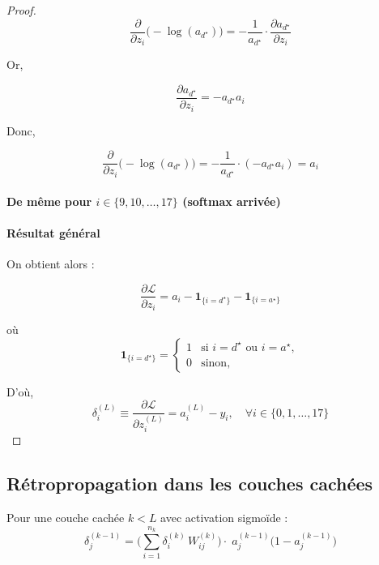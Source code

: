 \documentclass[12pt,a4paper]{report}
\numberwithin{equation}{section}
\begin{document}
\begin{proof}
$$\frac{\partial}{\partial z_i} \big(-\log(a_{d^\star})\big) 
= - \frac{1}{a_{d^\star}} \cdot \frac{\partial a_{d^\star}}{\partial z_i}$$

Or,

$$\frac{\partial a_{d^\star}}{\partial z_i} 
= -a_{d^\star} a_i$$

Donc,

$$\frac{\partial}{\partial z_i} \big(-\log(a_{d^\star})\big) 
= - \frac{1}{a_{d^\star}} \cdot (-a_{d^\star} a_i)
= a_i$$

\paragraph{De même pour $i \in \{9, 10, \ldots, 17\}$ (softmax arrivée)}

\paragraph{Résultat général}

On obtient alors :

$$\frac{\partial \mathcal{L}}{\partial z_i} = a_i - \mathbf{1}_{\{i = d^\star\}} - \mathbf{1}_{\{i = a^\star\}}$$

où
$$
\mathbf{1}_{\{i = d^\star\}} =
\begin{cases}
1 & \text{si } i = d^\star \text{ ou } i = a^\star, \\
0 & \text{sinon},
\end{cases}
$$

D'où,
$$
\boxed{
\delta^{(L)}_i \equiv \frac{\partial \mathcal{L}}{\partial z^{(L)}_i} = a^{(L)}_i - y_i, \quad \forall i \in \{0, 1, \ldots, 17\}}
$$

\end{proof}

\subsection{Rétropropagation dans les couches cachées}

\begin{theorem}
Pour une couche cachée $k < L$ avec activation sigmoïde :
$$\delta^{(k-1)}_j
= \Big(\sum_{i=1}^{n_k} \delta^{(k)}_i \, W^{(k)}_{ij}\Big)
\cdot\; a^{(k-1)}_j\bigl(1-a^{(k-1)}_j\bigr)
$$
\end{theorem}
\end{document}
